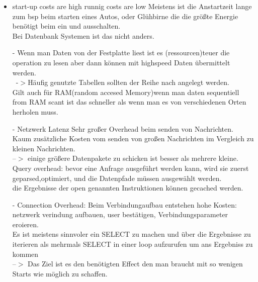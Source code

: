 \documentclass[12pt]{article}\pagestyle{myheadings}
\theoremstyle{plain}
\begin{document}
\begin{enumerate}
\begin{itemize}
\begin{center}
\end{center}
\item start-up costs are high runnig costs are low
Meistens ist die Anstartzeit lange zum bsp beim starten eines Autos, oder Glühbirne die die größte Energie benötigt beim ein und ausschalten.\\
Bei Datenbank Systemen ist das nicht anders.\\
\item [-]Wenn man Daten von der Festplatte liest ist es (ressourcen)teuer die operation zu lesen aber dann können mit highspeed Daten übermittelt werden.\\\
-$>$Häufig genutzte Tabellen sollten der Reihe nach angelegt werden.\\
Gilt auch für RAM(random accesed Memory)wenn man daten sequentiell from RAM scant ist das schneller als wenn man es von verschiedenen Orten herholen muss.
\\
\item[-]Netzwerk Latenz 
Sehr großer Overhead beim senden von Nachrichten.
Kaum zusätzliche Kosten vom senden von großen Nachrichten im Vergleich zu kleinen Nachrichten.\\
--$>$ einige größere Datenpakete zu schicken ist besser als mehrere kleine.\\
Query overhead: bevor eine Anfrage ausgeführt werden kann, wird sie zuerst geparsed,optimiert, und die Datenpfade müssen ausgewählt werden. \\
die Ergebnisse der open genannten Instruktionen können gecached werden.\\
\item[-]Connection Overhead: Beim Verbindungaufbau entstehen hohe Kosten: netzwerk verindung aufbauen, user bestätigen, Verbindungsparameter eroieren.\\
Es ist meistens sinnvoler ein SELECT zu machen und über die Ergebnisse zu iterieren als mehrmals SELECT in einer loop aufzurufen um ans Ergebniss zu kommen\\
--$>$ Das Ziel ist es den benötigten Effect den man braucht mit so wenigen Starts wie möglich zu schaffen.


\end{itemize}
\end{enumerate}
\end{document}

